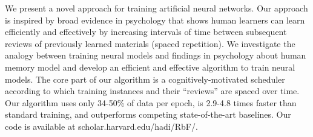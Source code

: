 We present a novel approach for training artificial neural networks. Our approach is inspired by broad evidence in psychology that shows human learners can learn efficiently and effectively by increasing intervals of time between subsequent reviews of previously learned materials (spaced repetition). We investigate the analogy between training neural models and findings in psychology about human memory model and develop an efficient and effective algorithm to train neural models. The core part of our algorithm is a cognitively-motivated scheduler according to which training instances and their ``reviews'' are spaced over time. Our algorithm uses only 34-50\% of data per epoch, is 2.9-4.8 times faster than standard training, and outperforms competing state-of-the-art baselines. Our code is available at scholar.harvard.edu/hadi/RbF/.

